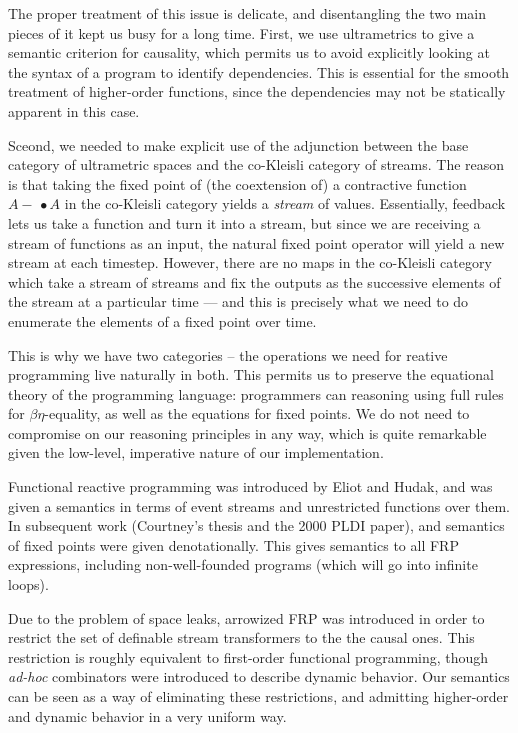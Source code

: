 \documentclass[preprint]{sigplanconf}
\newcommand{\lollishrink}{-\!\!\!\,\bullet}
\begin{document}
The proper treatment of this issue is delicate, and disentangling the
two main pieces of it kept us busy for a long time. First, we use
ultrametrics to give a semantic criterion for causality, which permits
us to avoid explicitly looking at the syntax of a program to identify
dependencies. This is essential for the smooth treatment of
higher-order functions, since the dependencies may not be statically
apparent in this case.

Sceond, we needed to make explicit use of the adjunction between the
base category of ultrametric spaces and the co-Kleisli category of
streams. The reason is that taking the fixed point of (the coextension
of) a contractive function $A \lollishrink A$ in the co-Kleisli
category yields a \emph{stream} of values. Essentially, feedback lets
us take a function and turn it into a stream, but since we are
receiving a stream of functions as an input, the natural fixed point
operator will yield a new stream at each timestep.  However, there are
no maps in the co-Kleisli category which take a stream of streams and
fix the outputs as the successive elements of the stream at a
particular time --- and this is precisely what we need to do enumerate
the elements of a fixed point over time.

This is why we have two categories -- the operations we need for
reative programming live naturally in both. This permits us to
preserve the equational theory of the programming language:
programmers can reasoning using full rules for $\beta\eta$-equality,
as well as the equations for fixed points. We do not need to
compromise on our reasoning principles in any way, which is quite
remarkable given the low-level, imperative nature of our
implementation.

Functional reactive programming was introduced by Eliot and Hudak, and
was given a semantics in terms of event streams and unrestricted
functions over them. In subsequent work (Courtney's thesis and the
2000 PLDI paper), and semantics of fixed points were given
denotationally. This gives semantics to all FRP expressions, including
non-well-founded programs (which will go into infinite loops).

Due to the problem of space leaks, arrowized FRP was introduced in
order to restrict the set of definable stream transformers to the the
causal ones. This restriction is roughly equivalent to first-order
functional programming, though \emph{ad-hoc} combinators were
introduced to describe dynamic behavior. Our semantics can be seen as
a way of eliminating these restrictions, and admitting higher-order
and dynamic behavior in a very uniform way.
\end{document}
